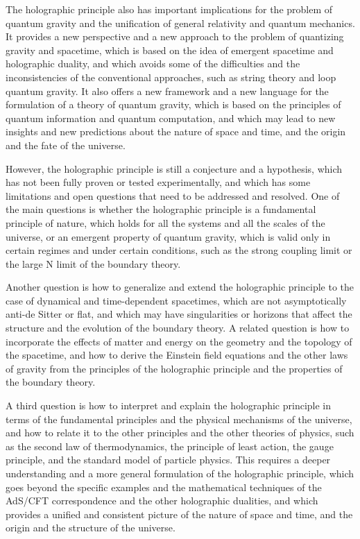 \begin{tcolorbox}[colback=green!5!white,colframe=green!75!black,title=Question]
    The holographic principle also has important implications for the problem of quantum gravity and the unification of general relativity and quantum mechanics. It provides a new perspective and a new approach to the problem of quantizing gravity and spacetime, which is based on the idea of emergent spacetime and holographic duality, and which avoids some of the difficulties and the inconsistencies of the conventional approaches, such as string theory and loop quantum gravity. It also offers a new framework and a new language for the formulation of a theory of quantum gravity, which is based on the principles of quantum information and quantum computation, and which may lead to new insights and new predictions about the nature of space and time, and the origin and the fate of the universe.

    However, the holographic principle is still a conjecture and a hypothesis, which has not been fully proven or tested experimentally, and which has some limitations and open questions that need to be addressed and resolved. One of the main questions is whether the holographic principle is a fundamental principle of nature, which holds for all the systems and all the scales of the universe, or an emergent property of quantum gravity, which is valid only in certain regimes and under certain conditions, such as the strong coupling limit or the large N limit of the boundary theory.

    Another question is how to generalize and extend the holographic principle to the case of dynamical and time-dependent spacetimes, which are not asymptotically anti-de Sitter or flat, and which may have singularities or horizons that affect the structure and the evolution of the boundary theory. A related question is how to incorporate the effects of matter and energy on the geometry and the topology of the spacetime, and how to derive the Einstein field equations and the other laws of gravity from the principles of the holographic principle and the properties of the boundary theory.

    A third question is how to interpret and explain the holographic principle in terms of the fundamental principles and the physical mechanisms of the universe, and how to relate it to the other principles and the other theories of physics, such as the second law of thermodynamics, the principle of least action, the gauge principle, and the standard model of particle physics. This requires a deeper understanding and a more general formulation of the holographic principle, which goes beyond the specific examples and the mathematical techniques of the AdS/CFT correspondence and the other holographic dualities, and which provides a unified and consistent picture of the nature of space and time, and the origin and the structure of the universe.


\end{tcolorbox}
